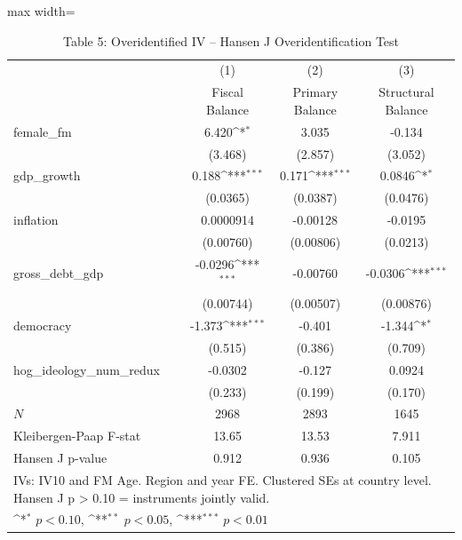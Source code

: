 \begin{table}[htbp]\centering
\def\sym#1{\ifmmode^{#1}\else\(^{#1}\)\fi}
\caption{Table 5: Overidentified IV -- Hansen J Overidentification Test}
\begin{adjustbox}{max width=\textwidth}
\small
\begin{tabular}{l*{3}{c}}
\hline\hline
            &\multicolumn{1}{c}{(1)}&\multicolumn{1}{c}{(2)}&\multicolumn{1}{c}{(3)}\\
            &\multicolumn{1}{c}{Fiscal Balance}&\multicolumn{1}{c}{Primary Balance}&\multicolumn{1}{c}{Structural Balance}\\
\hline
female\_fm   &       6.420\sym{*}  &       3.035         &      -0.134         \\
            &     (3.468)         &     (2.857)         &     (3.052)         \\
[1em]
gdp\_growth  &       0.188\sym{***}&       0.171\sym{***}&      0.0846\sym{*}  \\
            &    (0.0365)         &    (0.0387)         &    (0.0476)         \\
[1em]
inflation   &   0.0000914         &    -0.00128         &     -0.0195         \\
            &   (0.00760)         &   (0.00806)         &    (0.0213)         \\
[1em]
gross\_debt\_gdp&     -0.0296\sym{***}&    -0.00760         &     -0.0306\sym{***}\\
            &   (0.00744)         &   (0.00507)         &   (0.00876)         \\
[1em]
democracy   &      -1.373\sym{***}&      -0.401         &      -1.344\sym{*}  \\
            &     (0.515)         &     (0.386)         &     (0.709)         \\
[1em]
hog\_ideology\_num\_redux&     -0.0302         &      -0.127         &      0.0924         \\
            &     (0.233)         &     (0.199)         &     (0.170)         \\
\hline
\(N\)       &        2968         &        2893         &        1645         \\
Kleibergen-Paap F-stat&       13.65         &       13.53         &       7.911         \\
Hansen J p-value&       0.912         &       0.936         &       0.105         \\
\hline\hline
\multicolumn{4}{l}{\footnotesize IVs: IV10 and FM Age. Region and year FE. Clustered SEs at country level.  Hansen J p > 0.10 = instruments jointly valid.}\\
\multicolumn{4}{l}{\footnotesize \sym{*} \(p<0.10\), \sym{**} \(p<0.05\), \sym{***} \(p<0.01\)}\\
\end{tabular}
\end{adjustbox}
\end{table}

